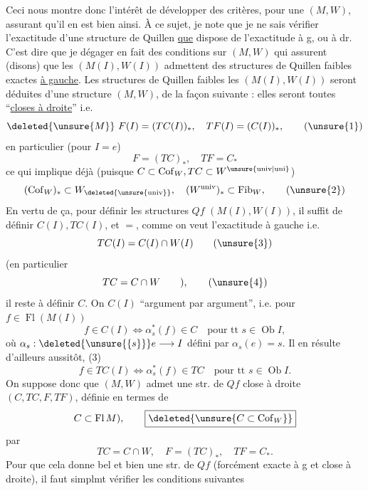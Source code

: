 Ceci nous montre donc l'intérêt de développer des critères, pour une $(M,W)$, assurant qu'il en est bien ainsi. À ce sujet, je note que je ne sais  vérifier l'exactitude d'une structure de Quillen \uline{que}   dispose de l'exactitude à g, ou à dr. C'est dire que je  dégager en fait des conditions sur $(M,W)$ qui assurent (disons) que les $(M(I),W(I))$ admettent des structures de Quillen faibles exactes \uline{à gauche}.
\begingroup\makeatletter\tagsleft@true\makeatother
Les structures de Quillen faibles  les $(M(I),W(I))$ seront déduites d'une structure  $(M,W)$, de la façon suivante : elles seront toutes ``\uline{closes à droite}'' i.e.
\[
 \deleted{\unsure{M}}\ F(I)=(TC(I))_{*},\quad TF(I)=(C(I))_{*},\tag*{(\unsure{1})}
\]
\endgroup
en particulier (pour $I=e$)
\[
 F=(TC)_{*},\quad TF=C_{*}
\]
ce qui implique déjà (puisque $C\subset\operatorname{Cof}_{W},TC\subset W^{\unsure{\mathrm{univ}|\mathrm{uni}}}$)
\[
 (\operatorname{Cof}_{W})_{*}\subset W_{\deleted{\unsure{\mathrm{univ}}}},\quad(W^{\mathrm{univ}})_{*}\subset\operatorname{Fib}_{W},\tag*{(\unsure{2})}
\]
En vertu de ça, pour définir les structures $Qf$  $(M(I),W(I))$, il suffit de définir $C(I),TC(I)$, et $=$, comme on veut l'exactitude à gauche i.e.
\[
 TC(I)=C(I)\cap W(I)\tag*{(\unsure{3})}
\]
(en particulier
\[
 TC=C\cap W\qquad),\tag*{(\unsure{4})}
\]
il reste à définir $C$. On   $C(I)$ ``argument  par argument'', i.e. pour $f\in\operatorname{Fl}(M(I))$
\[
 f\in C(I)\Longleftrightarrow\alpha_{s}^{*}(f)\in C\quad\text{pour tt }s\in\operatorname{Ob}I,\tag*{(5)}
\]
où $\alpha_{s}:\deleted{\unsure{\{s\}}}e\longrightarrow I$ défini par $\alpha_{s}(e)=s$.
Il en résulte d'ailleurs aussitôt,  (3) 
\[
 f\in TC(I)\Longleftrightarrow\alpha_{s}^{*}(f)\in TC\quad\text{pour tt }s\in\operatorname{Ob}I.\tag*{(6)}
\]
On suppose donc que $(M,W)$ admet une str. de $Qf$  close à droite $(C,TC,F,TF)$, définie en termes de
\[
 C\subset\operatorname{Fl}M),\qquad\boxed{\deleted{\unsure{C\subset\operatorname{Cof}_{W}}}}
\]
par
\[
 TC=C\cap W,\quad F=(TC)_{*},\quad TF=C_{*}.
\]
Pour que cela donne bel et bien une str. de $Qf$ (forcément exacte à g et close à droite), il faut simplmt  vérifier les conditions suivantes


